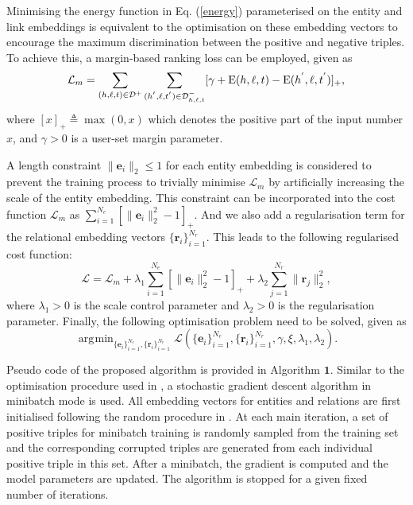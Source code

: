 \documentclass[9pt]{sig-alternate-05-2015}
\DeclareMathOperator*{\argmin}{\arg\!\min}
\begin{document}
Minimising the energy function in Eq. (\ref{energy}) parameterised on the entity and link embeddings is equivalent to the optimisation on these embedding vectors to encourage the maximum discrimination between  the positive  and negative triples. To achieve this, a margin-based ranking loss can be employed, given as
\begin{equation} \label{loss}
\small
\mathcal{L}_m = \sum_{(h,\ell,t)\in \mathcal{D}^+} \sum_{(h^{'},\ell,t^{'})\in  \mathcal{D}^{-}_{h,\ell,t}} [\gamma + \mathrm{E}(h,\ell,t)- \mathrm{E}(h^{'},\ell,t^{'}) ]_+,
\end{equation}
where $[x]_+ \triangleq \max(0,x)$ which denotes the positive part of the input number $x$, and $\gamma > 0$ is a user-set margin parameter.

A length constraint $\|\bm{e}_i\|_2 \leq 1$ for each entity embedding  is considered to prevent the training process to trivially minimise $\mathcal{L}_m$ by artificially increasing the scale of the entity embedding. This constraint can be incorporated into the cost function $\mathcal{L}_m$ as $ \sum_{i =1}^{N_e} \left[\|\bm{e}_i\|_2^2 - 1\right]_+ $.  And we also add a regularisation term  for the relational embedding vectors $\{\bm r_i\}_{i=1}^{N_r}$. This leads to the following regularised cost function:
\begin{equation} \label{loss2}
\mathcal{L} = \mathcal{L}_m  +\lambda_1 \sum_{i =1}^{N_e} \left[\|\bm{e}_i\|_2^2 - 1\right]_+ + \lambda_2 \sum_{j=1}^{N_r} \| \bm{r}_{j} \|_2^2,
\end{equation}
where $\lambda_1>0$ is the scale control parameter and $\lambda_2 >0$ is the regularisation parameter. Finally, the  following optimisation problem need to be solved, given as
\begin{equation}
\argmin_{\{\bm e_i\}_{i=1}^{N_e}, \{\bm r_i\}_{i=1}^{N_r}} \mathcal{L}\left(\{\bm e_i\}_{i=1}^{N_e}, \{\bm r_i\}_{i=1}^{N_r}, \gamma, \xi,\lambda_1, \lambda_2 \right).
\end{equation}

Pseudo code of the proposed algorithm is provided in Algorithm $\textbf{1}$. Similar to the optimisation procedure used in \cite{bordes_translating_2013}, a stochastic gradient descent algorithm in minibatch mode is used. All embedding vectors for entities and relations are first initialised following the random procedure in \cite{glorot_understanding_2010}. At each main iteration, a set of positive triples for minibatch training is randomly sampled from the training set and the corresponding corrupted triples are generated from each individual positive triple in this set. After a minibatch, the gradient is computed and the model parameters are updated. The algorithm is stopped for a given fixed number of iterations. 
\end{document}
